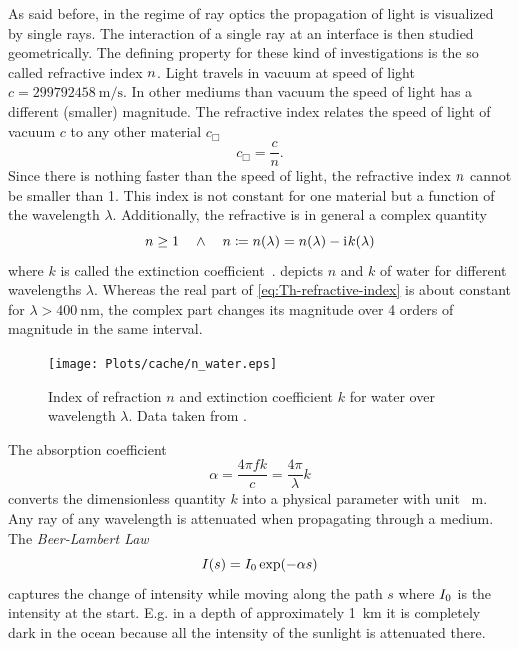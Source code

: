 As said before, in the regime of ray optics the propagation of light is 
visualized by single rays. The interaction of a single ray at an interface is 
then studied geometrically. The defining property for these kind of 
investigations is the so called refractive index $n$. Light travels 
in vacuum at speed of light $c=\SI{299792458}{\m\per\s}$. In other mediums than 
vacuum the speed of light has a different (smaller) magnitude. The refractive 
index relates the speed of light of vacuum $c$ to any other material $c_{\Box}$
\begin{equation}
  c_{\Box} = \frac{c}{n}.
  \label{eq:Th-lightspeed}
\end{equation}
Since there is nothing faster than the speed of light, the refractive index 
$n$ cannot be smaller than 1. This index is not constant for one 
material but a function of the wavelength $\lambda$. Additionally, the 
refractive is in general a complex quantity
\begin{equation}
  n\geq 1 \quad \wedge \quad n \coloneqq 
  n(\lambda) = n(\lambda) - \mathrm{i}\mkern1mu k(\lambda)
  \label{eq:Th-refractive-index}
\end{equation}
where $k$ is called the extinction coefficient~\cite{Jackson2013}. 
 depicts $n$ and $k$ of water for different wavelengths 
$\lambda$. Whereas the real part of \cref{eq:Th-refractive-index} is about 
constant for $\lambda > \SI{400}{\nm}$, the complex part changes its magnitude 
over 4 orders of magnitude in the same interval.

\begin{figure}[]
  \centering
  \texttt{[image: Plots/cache/n\_water.eps]}
  \caption{Index of refraction $n$ and extinction coefficient $k$ for water 
  over wavelength $\lambda$. Data taken from \cite{Hale1973,Segelstein1981}.}
  \label{fig:Th-n_water}
\end{figure}


The absorption coefficient~\cite{Hecht2017}
\begin{equation}
  \alpha = \frac{4\pi f k}{c} = \frac{4\pi}{\lambda}k
  \label{eq:Th-alpha}
\end{equation}
converts the dimensionless quantity $k$ into a physical parameter with unit 
\si{\per\meter}. Any ray of any wavelength is attenuated when propagating 
through a medium. The \emph{Beer-Lambert Law}
\begin{equation}
  I(s) = I_{0}\exp(-\alpha s)
  \label{eq:Th-beer-lambert}
\end{equation}
captures the change of intensity while moving along the path $s$ where 
$I_{0}$ is the intensity at the start. E.g. in a depth of 
approximately \SI{1}{\kilo\meter} it is completely dark in the ocean because 
all the intensity of the sunlight is attenuated there.

